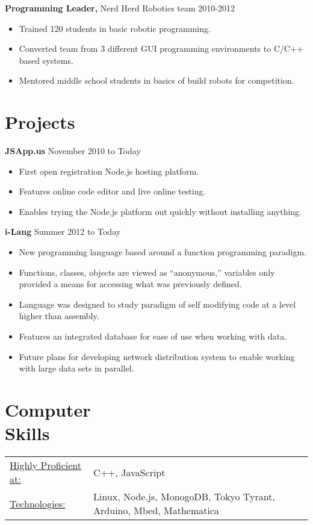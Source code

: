 \documentclass[margin]{res}
\begin{document}
\begin{resume}
{\bf Programming Leader,} Nerd Herd Robotics team \hfill 2010-2012
\begin{itemize} \itemsep -2pt
  \item Trained 120 students in basic robotic programming.
  \item Converted team from 3 different GUI programming environments to C/C++ based systems. %
  \item Mentored middle school students in basics of build robots for competition.
\end{itemize}


\section{Projects}
{\bf JSApp.us} \hfill November 2010 to Today
\begin{itemize} \itemsep -2pt
  \item First open registration Node.js hosting platform.
  \item Features online code editor and live online testing.
  \item Enables trying the Node.js platform out quickly without installing anything.
\end{itemize}

{\bf i-Lang} \hfill Summer 2012 to Today
\begin{itemize} \itemsep -2pt
  \item New programming language based around a function programming paradigm.
  \item Functions, classes, objects are viewed as ``anonymous,'' variables only provided a means for accessing what was previously defined.
  \item Language was designed to study paradigm of self modifying code at a level higher than assembly.
  \item Features an integrated database for ease of use when working with data.
  \item Future plans for developing network distribution system to enable working with large data sets in parallel.
\end{itemize}

\section{Computer \\ Skills}
   \begin{tabular}{l p{3in}}
    \underline{Highly Proficient at:} & C++, JavaScript \\

     \underline{Technologies:} & Linux, Node.js, MonogoDB, Tokyo Tyrant, Arduino, Mbed, Mathematica
 \end{tabular}

\end{resume}
\end{document}
